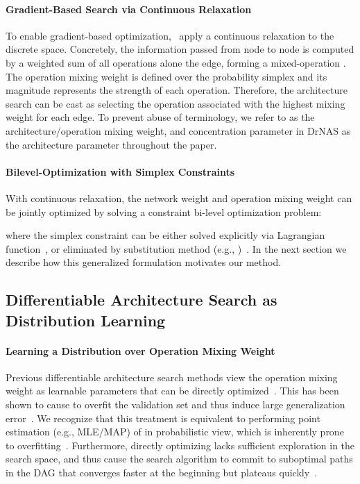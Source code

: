 \documentclass{article} \usepackage{iclr2021_conference,times}
\begin{document}
\paragraph{Gradient-Based Search via Continuous Relaxation}
To enable gradient-based optimization,~\citet{darts}
apply a continuous relaxation to the discrete space.
Concretely, the information passed from node  to node  is computed by a weighted sum of all operations alone the edge, forming a mixed-operation .
The operation mixing weight  is defined over the probability simplex and its magnitude represents the strength of each operation.
Therefore, the architecture search can be cast as selecting the operation associated with the highest mixing weight for each edge.
To prevent abuse of terminology, we refer to  as the architecture/operation mixing weight, and concentration parameter  in DrNAS as the architecture parameter throughout the paper.

\paragraph{Bilevel-Optimization with Simplex Constraints}
With continuous relaxation, the network weight  and operation mixing weight  can be jointly optimized by solving a constraint bi-level optimization problem:

where the simplex constraint  can be either solved explicitly via Lagrangian function~\citep{gaea}, or eliminated by substitution method (e.g., )~\citep{darts}.
In the next section we describe how this generalized formulation motivates our method.

\subsection{Differentiable Architecture Search as Distribution Learning}
\label{subsec:drnas}
\paragraph{Learning a Distribution over Operation Mixing Weight}
Previous differentiable architecture search methods view the operation mixing weight  as learnable parameters that can be directly optimized~\citep{darts, pcdarts, gaea}.
This has been shown to cause  to overfit the validation set and thus induce large generalization error~\citep{understanding,nasbench1shot1,smoothdarts}. 
We recognize that this treatment is equivalent to performing point estimation (e.g., MLE/MAP) of  in probabilistic view, which is inherently prone to overfitting~\citep{prml, bayesian}.
Furthermore, directly optimizing  lacks sufficient exploration in the search space, and thus cause the search algorithm to commit to suboptimal paths in the DAG that converges faster at the beginning but plateaus quickly~\citep{WideShallow}.
\end{document}
